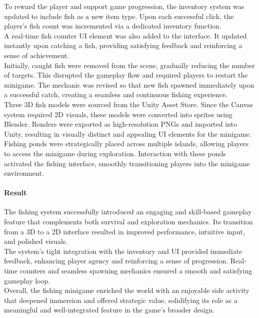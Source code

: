 \documentclass{article}
\begin{document}
To reward the player and support game progression, the inventory system was updated to include fish as a new item type. Upon each successful click, the player's fish count was incremented via a dedicated inventory function.\\

A real-time fish counter UI element was also added to the interface. It updated instantly upon catching a fish, providing satisfying feedback and reinforcing a sense of achievement.\\

Initially, caught fish were removed from the scene, gradually reducing the number of targets. This disrupted the gameplay flow and required players to restart the minigame. The mechanic was revised so that new fish spawned immediately upon a successful catch, creating a seamless and continuous fishing experience.\\

Three 3D fish models were sourced from the Unity Asset Store. Since the Canvas system required 2D visuals, these models were converted into sprites using Blender. Renders were exported as high-resolution PNGs and imported into Unity, resulting in visually distinct and appealing UI elements for the minigame.\\

Fishing ponds were strategically placed across multiple islands, allowing players to access the minigame during exploration. Interaction with these ponds activated the fishing interface, smoothly transitioning players into the minigame environment.

\paragraph{Result}\hfill

The fishing system successfully introduced an engaging and skill-based gameplay feature that complements both survival and exploration mechanics. Its transition from a 3D to a 2D interface resulted in improved performance, intuitive input, and polished visuals.\\

The system's tight integration with the inventory and UI provided immediate feedback, enhancing player agency and reinforcing a sense of progression. Real-time counters and seamless spawning mechanics ensured a smooth and satisfying gameplay loop.\\

Overall, the fishing minigame enriched the world with an enjoyable side activity that deepened immersion and offered strategic value, solidifying its role as a meaningful and well-integrated feature in the game's broader design.
\end{document}
